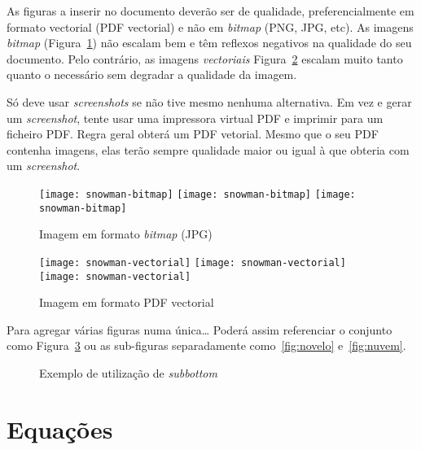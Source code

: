 As figuras a inserir no documento deverão ser de qualidade, preferencialmente em formato vectorial (PDF vectorial) e não em \emph{bitmap} (PNG, JPG, etc). As imagens \emph{bitmap} (Figura~\ref{fig:Figuras_Tree_silhouettes-bitmap}) não escalam bem e têm reflexos negativos na qualidade do seu documento.  Pelo contrário, as imagens \emph{vectoriais} {Figura~\ref{fig:Figuras_Tree_silhouettes-vectorial}} escalam muito tanto quanto o necessário sem degradar a qualidade da imagem.

Só deve usar \emph{screenshots} se não tive mesmo nenhuma alternativa.  Em vez e gerar um \emph{screenshot}, tente usar uma impressora virtual PDF e imprimir para um ficheiro PDF. Regra geral obterá um PDF vetorial. Mesmo que o seu PDF contenha imagens, elas terão sempre qualidade maior ou igual à que obteria com um \emph{screenshot}.


\begin{figure}[htbp]
	\centering
	\texttt{[image: snowman-bitmap]}
	\texttt{[image: snowman-bitmap]}
	\texttt{[image: snowman-bitmap]}
	\caption{Imagem em formato \emph{bitmap} (JPG)}
	\label{fig:Figuras_Tree_silhouettes-bitmap}
\end{figure}

\begin{figure}[htbp]
	\centering
	\texttt{[image: snowman-vectorial]}
	\texttt{[image: snowman-vectorial]}
	\texttt{[image: snowman-vectorial]}
	\caption{Imagem em formato PDF vectorial}
	\label{fig:Figuras_Tree_silhouettes-vectorial}
\end{figure}

Para agregar várias figuras numa única… Poderá assim referenciar o conjunto como Figura~\ref{fig:figura-completa} ou as sub-figuras separadamente como~\ref{fig:novelo} e~\ref{fig:nuvem}.


\begin{figure}[htbp]
	\centering
\qquad\qquad
  \caption{Exemplo de utilização de \emph{subbottom}}
  \label{fig:figura-completa}
\end{figure}

\section{Equações}

